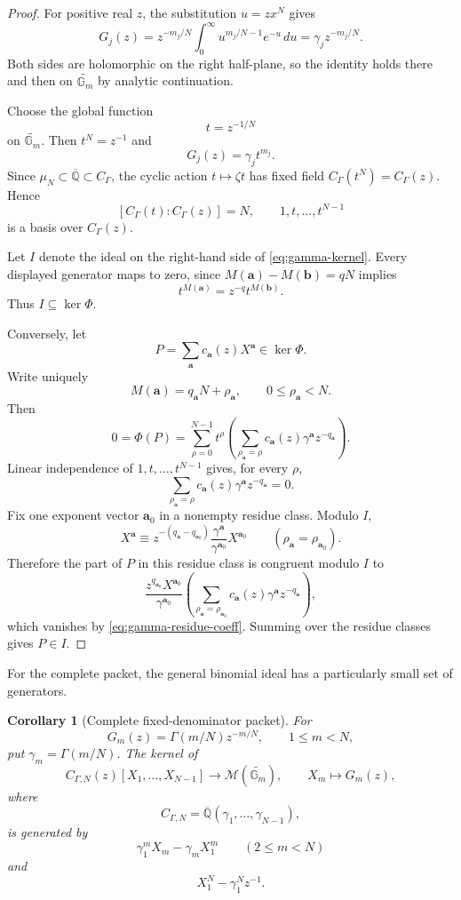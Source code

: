 \documentclass[11pt]{article}
\numberwithin{equation}{section}
\newtheorem{corollary}[corollary]{Corollary}
\theoremstyle{definition}
\theoremstyle{remark}
\newcommand{\Q}{\mathbb Q}
\newcommand{\Gm}{\mathbb G_m}
\begin{document}
\begin{proof}
For positive real $z$, the substitution $u=zx^N$ gives
\[
  G_j(z)
  =z^{-m_j/N}\int_0^\infty u^{m_j/N-1}e^{-u}\,du
  =\gamma_jz^{-m_j/N}.
\]
Both sides are holomorphic on the right half-plane, so the identity holds there
and then on $\widetilde{\Gm}$ by analytic continuation.

Choose the global function
\[
  t=z^{-1/N}
\]
on $\widetilde{\Gm}$.  Then $t^N=z^{-1}$ and
\[
  G_j(z)=\gamma_jt^{m_j}.
\]
Since $\mu_N\subset\overline{\Q}\subset C_\Gamma$, the cyclic action
$t\mapsto\zeta t$ has fixed field $C_\Gamma(t^N)=C_\Gamma(z)$.  Hence
\[
  [C_\Gamma(t):C_\Gamma(z)]=N,
  \qquad
  1,t,\ldots,t^{N-1}
\]
is a basis over $C_\Gamma(z)$.

Let $I$ denote the ideal on the right-hand side of
\eqref{eq:gamma-kernel}.  Every displayed generator maps to zero, since
$M(\mathbf a)-M(\mathbf b)=qN$ implies
\[
  t^{M(\mathbf a)}=z^{-q}t^{M(\mathbf b)}.
\]
Thus $I\subseteq\ker\Phi$.

Conversely, let
\[
  P=\sum_{\mathbf a}c_{\mathbf a}(z)X^{\mathbf a}\in\ker\Phi.
\]
Write uniquely
\[
  M(\mathbf a)=q_{\mathbf a}N+\rho_{\mathbf a},
  \qquad
  0\leq\rho_{\mathbf a}<N.
\]
Then
\[
  0=\Phi(P)
   =\sum_{\rho=0}^{N-1}t^\rho
      \left(
        \sum_{\rho_{\mathbf a}=\rho}
        c_{\mathbf a}(z)\gamma^{\mathbf a}z^{-q_{\mathbf a}}
      \right).
\]
Linear independence of $1,t,\ldots,t^{N-1}$ gives, for every $\rho$,
\begin{equation}\label{eq:gamma-residue-coeff}
  \sum_{\rho_{\mathbf a}=\rho}
  c_{\mathbf a}(z)\gamma^{\mathbf a}z^{-q_{\mathbf a}}=0.
\end{equation}
Fix one exponent vector $\mathbf a_0$ in a nonempty residue class.  Modulo $I$,
\[
  X^{\mathbf a}
  \equiv
  z^{-(q_{\mathbf a}-q_{\mathbf a_0})}
  \frac{\gamma^{\mathbf a}}{\gamma^{\mathbf a_0}}
  X^{\mathbf a_0}
  \qquad
  (\rho_{\mathbf a}=\rho_{\mathbf a_0}).
\]
Therefore the part of $P$ in this residue class is congruent modulo $I$ to
\[
  \frac{z^{q_{\mathbf a_0}}X^{\mathbf a_0}}
       {\gamma^{\mathbf a_0}}
  \left(
    \sum_{\rho_{\mathbf a}=\rho_{\mathbf a_0}}
    c_{\mathbf a}(z)\gamma^{\mathbf a}z^{-q_{\mathbf a}}
  \right),
\]
which vanishes by \eqref{eq:gamma-residue-coeff}.  Summing over the residue
classes gives $P\in I$.
\end{proof}

For the complete packet, the general binomial ideal has a particularly small
set of generators.

\begin{corollary}[Complete fixed-denominator packet]
\label{cor:complete-gamma-packet}
For
\[
  G_m(z)=\Gamma(m/N)z^{-m/N},
  \qquad 1\leq m<N,
\]
put $\gamma_m=\Gamma(m/N)$.  The kernel of
\[
  C_{\Gamma,N}(z)[X_1,\ldots,X_{N-1}]
  \longrightarrow\mathscr M(\widetilde{\Gm}),
  \qquad X_m\longmapsto G_m(z),
\]
where
\[
  C_{\Gamma,N}=\overline{\Q}(\gamma_1,\ldots,\gamma_{N-1}),
\]
is generated by
\[
  \gamma_1^mX_m-\gamma_mX_1^m
  \qquad(2\leq m<N)
\]
and
\[
  X_1^N-\gamma_1^Nz^{-1}.
\]
\end{corollary}
\end{document}
